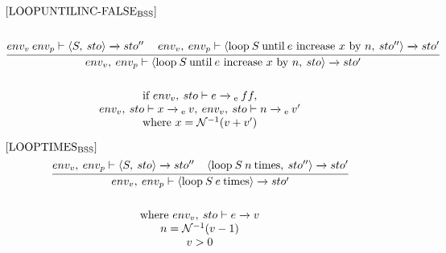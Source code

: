 \begin{equation}
\begin{split}
\begin{minipage}{\linewidth}
$[\text{LOOPUNTILINC-FALSE}_\text{BSS}]$
\end{minipage}
\\\\
\begin{minipage}{\linewidth}
\centering
$\cfrac{env_v \: env_p \vdash \langle S, \: sto \rangle \xrightarrow{} sto'' \quad\: env_v, \: env_p \vdash \langle \text{loop} \: S \: \text{until} \: e \text{ increase } x \text{ by } n, \: sto'' \rangle \xrightarrow{} sto'}{env_v, \: env_p \vdash \langle \text{loop} \: S \: \text{until} \: e \text{ increase } x \text{ by } n, \: sto \rangle \xrightarrow{} sto'}$ 
\end{minipage}
\\\\
\begin{minipage}{\linewidth}
\centering
if $env_v, \: sto \vdash e \xrightarrow{}\textsubscript{e} \: ff,$ \\
$env_v, \: sto \vdash x \xrightarrow{}\textsubscript{e} \: v, \: env_v, \: sto \vdash n \xrightarrow{}\textsubscript{e} \: v'$ 
\\ where $x = \mathcal{N}^{-1}(v+v')$
\end{minipage}
\end{split}
\end{equation}


\begin{equation}
\begin{split}
\begin{minipage}{\linewidth}
$[\text{LOOPTIMES}_\text{BSS}]$
\end{minipage}
\\
\begin{minipage}{\linewidth}
\centering
$\cfrac{env_v, \: env_p \vdash \langle S, \: sto \rangle \xrightarrow{} sto'' \: \: \: \: \: \langle \text{loop} \: S \: n \: \text{times}, \: sto'' \rangle \xrightarrow{} sto'}{env_v, \: env_p \vdash \langle \text{loop} \: S \: e \: \text{times} \rangle \xrightarrow{} sto'}$ 
\end{minipage}
\\\\
\begin{minipage}{\linewidth}
\centering
where $env_v, \: sto \vdash e \xrightarrow{} v$
\\
$n = \mathcal{N}^{-1}(v-1)$
\\
$v > 0$
\end{minipage}
\end{split}
\end{equation}

